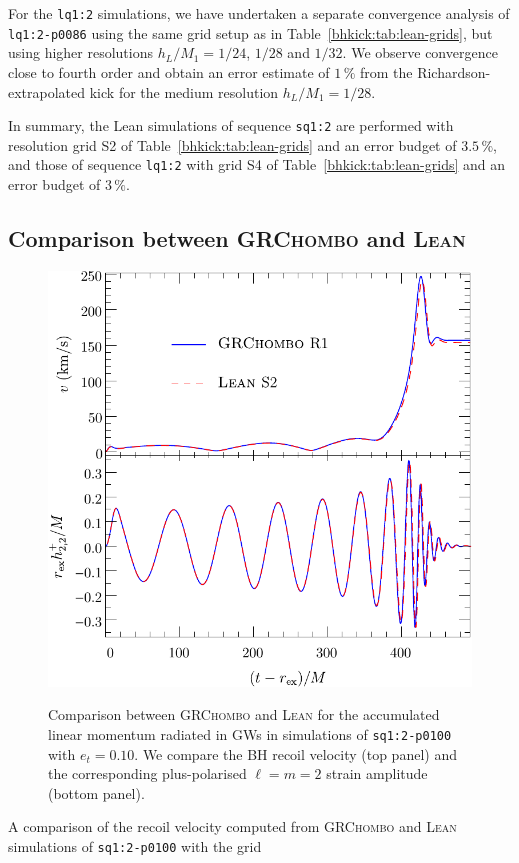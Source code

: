 For the \texttt{lq1:2} simulations, we have undertaken a separate
convergence analysis of \texttt{lq1:2-p0086} using the same grid
setup as in
Table~\ref{bhkick:tab:lean-grids}, but using higher resolutions
$h_L/M_1=1/24$, $1/28$ and $1/32$. We observe convergence close to
fourth order and obtain an error estimate of $1\,\%$ from
the Richardson-extrapolated kick for the medium resolution
$h_L/M_1=1/28$.

In summary, the {\sc Lean} simulations of sequence \texttt{sq1:2} are
performed with resolution grid S2 of Table~\ref{bhkick:tab:lean-grids} and an
error budget of $3.5\,\%$, and those of sequence \texttt{lq1:2} with
grid S4 of Table~\ref{bhkick:tab:lean-grids} and an error budget of $3\,\%$.

\subsection{Comparison between \textsc{GRChombo} and \textsc{Lean}}
\label{bhkick:sec:code-comparison}
\begin{figure}[t]
    {
    \centering
    \includegraphics[width=0.7\columnwidth]{bhkick/grchombo-lean-comparison3.pdf}
    }
    \caption{Comparison between \textsc{GRChombo} and \textsc{Lean}
    for the accumulated linear momentum radiated in GWs in simulations
    of \texttt{sq1:2-p0100} with $e_t=0.10$.
    We compare the BH recoil velocity (top panel)
    and the corresponding plus-polarised $\ell=m=2$ strain
    amplitude (bottom panel).
    }
    \label{bhkick:fig:grchombo-lean-comparison}
\end{figure}
A comparison of the recoil velocity computed from \textsc{GRChombo}
and \textsc{Lean} simulations of \texttt{sq1:2-p0100} with the grid
